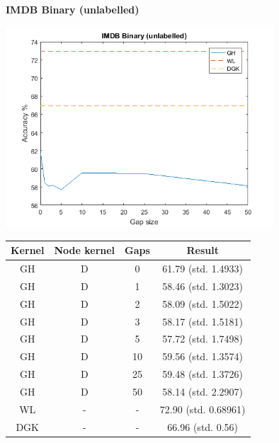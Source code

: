 \documentclass{article}
\begin{document}
\textbf{IMDB Binary (unlabelled)}\\
\begin{minipage}{0.6\linewidth}
	\hspace*{-1in}
	\includegraphics[width=10cm]{imdb_unlabelled}
	\label{fig:imdb_unlabelled}
\end{minipage}
\begin{minipage}[c]{0.5\linewidth}	
	\centering
	\begin{tabular}{c|c|c|c}
		Kernel & Node kernel & Gaps & Result\\
		\hline
		GH & D & 0 & 61.79 (std. 1.4933)\\
		GH & D & 1 & 58.46 (std. 1.3023)\\
		GH & D & 2 & 58.09 (std. 1.5022)\\
		GH & D & 3 & 58.17 (std. 1.5181)\\
		GH & D & 5 & 57.72 (std. 1.7498)\\
		GH & D & 10 & 59.56 (std. 1.3574)\\
		GH & D & 25 & 59.48 (std. 1.3726)\\
		GH & D & 50 & 58.14 (std. 2.2907)\\
		WL & - & - & 72.90 (std. 0.68961)\\
		DGK & - & - & 66.96 (std. 0.56) \\
	\end{tabular}
	\label{table:imdb_unlabelled}
\end{minipage}
\end{document}
